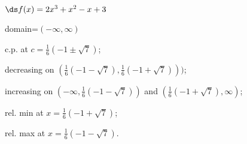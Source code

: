 {$\ds f(x) =2 x^3+x^2-x+3$
}
{domain=$(-\infty,\infty)$

c.p. at $c=\frac16(-1\pm\sqrt{7})$; 

decreasing on $(\frac16(-1-\sqrt{7}),\frac16(-1+\sqrt{7})))$;

increasing on $(-\infty,\frac16(-1-\sqrt{7}))$ and $(\frac16(-1+\sqrt{7}),\infty)$;

rel. min at $x=\frac16(-1+\sqrt{7})$;

rel. max at $x=\frac16(-1-\sqrt{7})$.
}

